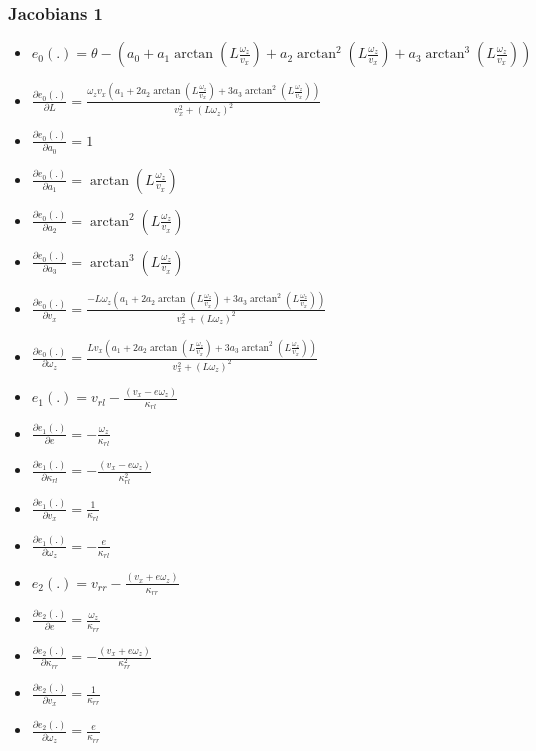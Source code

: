 \documentclass[12pt]{article}
\begin{document}
      \subsubsection{Jacobians 1}
        \begin{itemize}
          \item $e_0(.) = \theta - (a_0 + a_1\arctan(L\frac{\omega_z}{v_x}) +
            a_2\arctan^2(L\frac{\omega_z}{v_x}) +
            a_3\arctan^3(L\frac{\omega_z}{v_x}))$
          \item $\frac{\partial e_0(.)}{\partial L} =
            \frac{\omega_z v_x (a_1 + 2 a_2\arctan(L\frac{\omega_z}{v_x}) +
            3 a_3\arctan^2(L\frac{\omega_z}{v_x}))}{v_x^2 + (L\omega_z)^2}$
          \item $\frac{\partial e_0(.)}{\partial a_0} = 1$
          \item $\frac{\partial e_0(.)}{\partial a_1} =
            \arctan(L\frac{\omega_z}{v_x})$
          \item $\frac{\partial e_0(.)}{\partial a_2} =
            \arctan^2(L\frac{\omega_z}{v_x})$
          \item $\frac{\partial e_0(.)}{\partial a_3} =
            \arctan^3(L\frac{\omega_z}{v_x})$
          \item $\frac{\partial e_0(.)}{\partial v_x} =
            \frac{-L\omega_z(a_1 + 2 a_2\arctan(L\frac{\omega_z}{v_x}) +
            3 a_3\arctan^2(L\frac{\omega_z}{v_x}))}{v_x^2 + (L\omega_z)^2}$
          \item $\frac{\partial e_0(.)}{\partial \omega_z} =
            \frac{L v_x(a_1 + 2 a_2\arctan(L\frac{\omega_z}{v_x}) +
            3 a_3\arctan^2(L\frac{\omega_z}{v_x}))}{v_x^2 + (L\omega_z)^2}$

          \item $e_1(.) = v_{rl} - \frac{(v_x - e\omega_z)}{\kappa_{rl}}$
          \item $\frac{\partial e_1(.)}{\partial e} =
            -\frac{\omega_z}{\kappa_{rl}}$
          \item $\frac{\partial e_1(.)}{\partial \kappa_{rl}} =
            -\frac{(v_x - e\omega_z)}{\kappa_{rl}^2}$
          \item $\frac{\partial e_1(.)}{\partial v_x} = \frac{1}{\kappa_{rl}}$
          \item $\frac{\partial e_1(.)}{\partial \omega_z} =
            -\frac{e}{\kappa_{rl}}$

          \item $e_2(.) = v_{rr} - \frac{(v_x + e\omega_z)}{\kappa_{rr}}$
          \item $\frac{\partial e_2(.)}{\partial e} =
            \frac{\omega_z}{\kappa_{rr}}$
          \item $\frac{\partial e_2(.)}{\partial \kappa_{rr}} =
            -\frac{(v_x + e\omega_z)}{\kappa_{rr}^2}$
          \item $\frac{\partial e_2(.)}{\partial v_x} = \frac{1}{\kappa_{rr}}$
          \item $\frac{\partial e_2(.)}{\partial \omega_z} =
            \frac{e}{\kappa_{rr}}$


\end{itemize}
\end{document}
